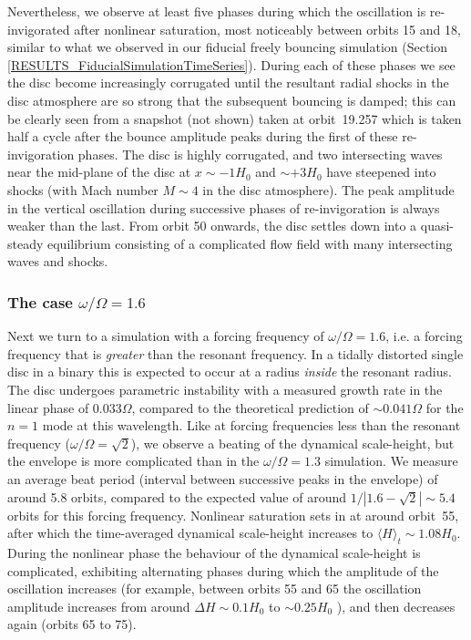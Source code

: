 \documentclass[fleqn,usenatbib]{mnras}
\begin{document}
Nevertheless, we observe at least five phases during which the oscillation is re-invigorated after nonlinear saturation, most noticeably between orbits 15 and 18, similar to what we observed in our fiducial freely bouncing simulation (Section \ref{RESULTS_FiducialSimulationTimeSeries}). During each of these phases we see the disc become increasingly corrugated until the resultant radial shocks in the disc atmosphere are so strong that the subsequent bouncing is damped; this can be clearly seen from a snapshot (not shown) taken at orbit~19.257 which is taken half a cycle after the bounce amplitude peaks during the first of these re-invigoration phases. The disc is highly corrugated, and two intersecting waves near the mid-plane of the disc at $x \sim -1H_0$ and $\sim +3H_0$ have steepened into shocks (with Mach number $M \sim 4$ in the disc atmosphere). The peak amplitude in the vertical oscillation during successive phases of %
re-invigoration is always weaker than the last. From orbit 50 onwards, the disc settles down into a quasi-steady equilibrium consisting of a complicated flow field with many intersecting waves and shocks.

\subsubsection{The case $\omega/\Omega = 1.6$}
\label{SECTION_ForcedBounceSimulation_Omega1pt6_a0pt1}
Next we turn to a simulation with a forcing frequency of $\omega/\Omega = 1.6$, i.e. a forcing frequency that is \textit{greater} than the resonant frequency. In a tidally distorted single disc in a binary this is expected to occur at a radius \textit{inside} the resonant radius. The disc undergoes parametric instability with a measured growth rate in the linear phase of $0.033 \Omega$, compared to the theoretical prediction of $\sim 0.041\Omega$ for the $n = 1$ mode at this wavelength. Like at forcing frequencies less than the resonant frequency ($\omega/\Omega = \sqrt{2}$), we observe a beating of the dynamical scale-height, but the envelope is more complicated than in the $\omega/\Omega = 1.3$ simulation. We measure an average beat period (interval between successive peaks in the envelope) of around 5.8 orbits, compared to the expected value of around $1/|1.6-\sqrt{2}| \sim 5.4$ orbits for this forcing frequency. Nonlinear saturation sets in at around orbit~55, after which the time-averaged dynamical scale-height increases to $\langle H \rangle_t \sim 1.08H_0$. During the nonlinear phase the behaviour of the dynamical scale-height is complicated, exhibiting alternating phases during which the amplitude of the oscillation increases (for example, between orbits 55 and 65 the oscillation amplitude increases from around $\Delta H \sim 0.1H_0$ to $\sim 0.25 H_0$ ), and then decreases again (orbits 65 to 75).
\end{document}

